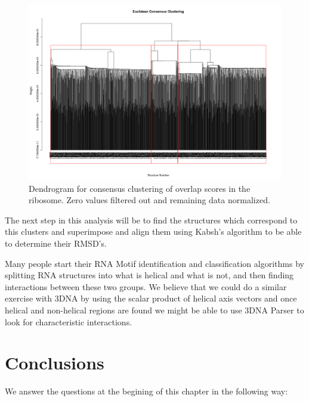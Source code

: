 \begin{figure}[htbp]
\centering 
\includegraphics[angle=90, scale=0.6]{Chapter5/eucli_cons.png}
\caption{Dendrogram for consensus clustering  of overlap scores in the
  ribosome.  Zero values filtered out and remaining data normalized.}
\end{figure}

The next  step in this analysis  will be to find  the structures which
correspond  to this  clusters  and superimpose  and  align them  using
Kabsh's algorithm to be able to determine their RMSD's.

Many people  start their  RNA Motif identification  and classification
algorithms by splitting  RNA structures into what is  helical and what
is not,  and then  finding interactions between  these two  groups. We
believe that  we could do  a similar exercise  with 3DNA by  using the
scalar  product   of  helical  axis  vectors  and   once  helical  and
non-helical regions are  found we might be able to  use 3DNA Parser to
look for characteristic interactions.


\section{Conclusions}
We  answer  the questions  at  the begining  of  this  chapter in  the
following way:

